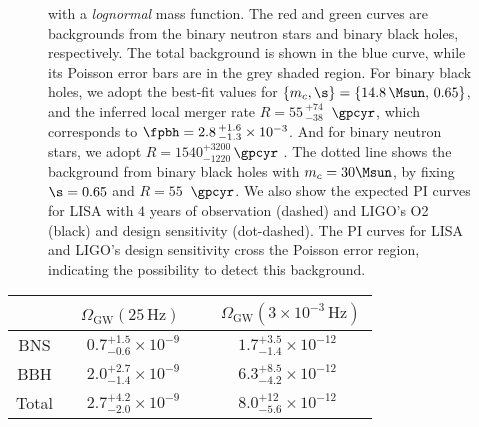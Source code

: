 \begin{figure}[htbp!]
{    with a \textit{lognormal} mass function. 
    The red and green curves are backgrounds from the binary neutron stars and binary black holes, respectively. 
    The total background is shown in the blue curve, while
    its Poisson error bars are in the grey shaded region.
    For binary black holes, we adopt the best-fit values for 
    $\{m_c, \s\} = \{14.8\, \Msun,\,0.65\}$, 
    and the inferred local merger rate $R = 55\,^{+74}_{-38}$\, $\gpcyr$,
    which corresponds to $\fpbh = 2.8\,^{+1.6}_{-1.3} \times 10^{-3}$.
    And for binary neutron stars, we adopt $R = 1540_{-1220}^{+3200}$\,$\gpcyr$ 
    \citep{TheLIGOScientific:2017qsa}.
    The dotted line shows the background from binary black holes with $m_c = 30 \Msun$, 
    by fixing $\s = 0.65$ and $R = 55$\, $\gpcyr$.
    We also show the expected PI curves for LISA with $4$ years of 
    observation (dashed) and
    LIGO's O2 (black) and design sensitivity (dot-dashed).
    The PI curves for LISA and LIGO's design sensitivity cross the Poisson
    error region, indicating the possibility to detect this background.}
\end{figure}

\begin{table}[htb!]
    \centering
    \begin{tabular}{c|c|c}
        &\ $\Omega_{\mathrm{GW}}(25 \, \mathrm{Hz})$ \
        &\ $\Omega_{\mathrm{GW}}(3 \times 10^{-3} \, \mathrm{Hz})$\,\\
        \hline
        BNS\, &  $0.7^{+1.5}_{-0.6} \times 10^{-9}$ 
        & $1.7^{+3.5}_{-1.4} \times 10^{-12}$ \\
        [.3em]
        \hline
        BBH\, & $2.0^{+2.7}_{-1.4} \times 10^{-9}$  
        & $6.3^{+8.5}_{-4.2} \times 10^{-12}$ \\
        [.3em]
        \hline
        Total\, & $2.7^{+4.2}_{-2.0} \times 10^{-9}$  
        & $8.0^{+12}_{-5.6} \times 10^{-12}$ \\
        [.2em]
    \end{tabular}
\end{table}

